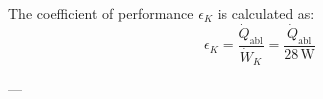 The coefficient of performance \( \epsilon_K \) is calculated as:  
\[
\epsilon_K = \frac{\dot{Q}_{\text{abl}}}{\dot{W}_K} = \frac{\dot{Q}_{\text{abl}}}{28 \, \text{W}}
\]

---